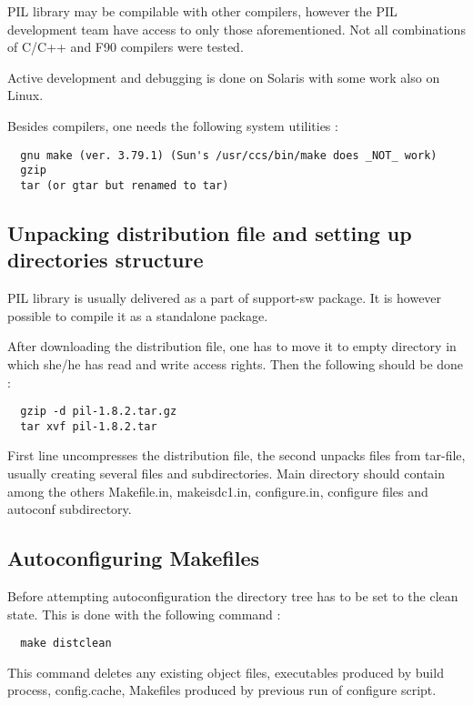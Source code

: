 PIL library may be compilable with other compilers, however 
the PIL development team have access to only those aforementioned.
Not all combinations of C/C++ and F90 compilers were tested.

Active development and debugging is done on Solaris with some
work also on Linux.

Besides compilers, one needs the following system utilities :

\begin{verbatim}
  gnu make (ver. 3.79.1) (Sun's /usr/ccs/bin/make does _NOT_ work)
  gzip
  tar (or gtar but renamed to tar)
\end{verbatim}


\subsection{Unpacking distribution file and setting up directories structure}

PIL library is usually delivered as a part of support-sw package. It is
however possible to compile it as a standalone package.

After downloading the distribution file, one has to move it to empty directory
in which she/he has read and write access rights. Then the following
should be done :

\begin{verbatim}
  gzip -d pil-1.8.2.tar.gz
  tar xvf pil-1.8.2.tar
\end{verbatim}

First line uncompresses the distribution file, the second unpacks files from
tar-file, usually creating several files and subdirectories. Main directory
should contain among the others Makefile.in, makeisdc1.in, configure.in, 
configure files and autoconf subdirectory.


\subsection{Autoconfiguring Makefiles}

Before attempting autoconfiguration the directory tree has to be set to the
clean state. This is done with the following command :

\begin{verbatim}
  make distclean
\end{verbatim}

This command deletes any existing object files, executables produced by
build process, config.cache, Makefiles produced by previous run of configure
script.

